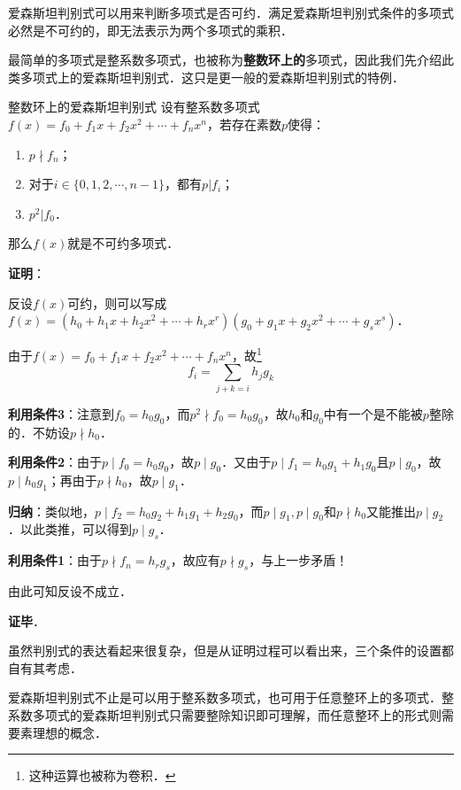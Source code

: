 
爱森斯坦判别式可以用来判断多项式是否可约．满足爱森斯坦判别式条件的多项式必然是不可约的，即无法表示为两个多项式的乘积．

最简单的多项式是整系数多项式，也被称为\textbf{整数环上的}多项式，因此我们先介绍此类多项式上的爱森斯坦判别式．这只是更一般的爱森斯坦判别式的特例．

\begin{theorem}{整数环上的爱森斯坦判别式}\label{EsstCr_the1}
设有整系数多项式$f(x)=f_0+f_1x+f_2x^2+\cdots+f_nx^n$，若存在素数$p$使得：
\begin{enumerate}
\item $p\nmid f_n$；
\item 对于$i\in\{0, 1, 2, \cdots, n-1\}$，都有$p|f_i$；
\item $p^2|f_0$．
\end{enumerate}
那么$f(x)$就是不可约多项式．
\end{theorem}

\textbf{证明}：

反设$f(x)$可约，则可以写成$f(x)=(h_0+h_1x+h_2x^2+\cdots+h_rx^r)(g_0+g_1x+g_2x^2+\cdots+g_sx^s)$．

由于$f(x)=f_0+f_1x+f_2x^2+\cdots+f_nx^n$，故\footnote{这种运算也被称为卷积．}\begin{equation}f_i=\sum\limits_{j+k=i}h_jg_k\end{equation}

\textbf{利用条件3}：注意到$f_0=h_0g_0$，而$p^2\nmid f_0=h_0g_0$，故$h_0$和$g_0$中有一个是不能被$p$整除的．不妨设$p\nmid h_0$．

\textbf{利用条件2}：由于$p\mid f_0=h_0g_0$，故$p\mid g_0$．又由于$p\mid f_1=h_0g_1+h_1g_0$且$p\mid g_0$，故$p\mid h_0g_1$；再由于$p\nmid h_0$，故$p\mid g_1$．

\textbf{归纳}：类似地，$p\mid f_2=h_0g_2+h_1g_1+h_2g_0$，而$p\mid g_1, p\mid g_0$和$p\nmid h_0$又能推出$p\mid g_2$．以此类推，可以得到$p\mid g_s$．

\textbf{利用条件1}：由于$p\nmid f_n=h_rg_s$，故应有$p\nmid g_s$，与上一步矛盾！

由此可知反设不成立．

\textbf{证毕}．

虽然判别式的表达看起来很复杂，但是从证明过程可以看出来，三个条件的设置都自有其考虑．

爱森斯坦判别式不止是可以用于整系数多项式，也可用于任意整环上的多项式．整系数多项式的爱森斯坦判别式只需要整除知识即可理解，而任意整环上的形式则需要素理想的概念．

